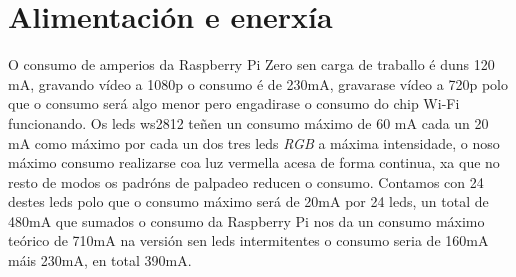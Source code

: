 \section{Alimentación e enerxía}
O consumo de amperios da Raspberry Pi Zero sen carga de traballo é duns 120 mA, gravando vídeo a 1080p o consumo é de 230mA, gravarase vídeo a 720p polo que o consumo será algo menor pero engadirase o consumo do chip Wi-Fi funcionando. Os leds ws2812 teñen un consumo máximo de 60 mA cada un 20 mA como máximo por cada un dos tres leds \emph{RGB} a máxima intensidade, o noso máximo consumo realizarse coa luz vermella acesa de forma continua, xa que no resto de modos os padróns de palpadeo reducen o consumo. Contamos con 24 destes leds polo que o consumo máximo será de 20mA por 24 leds, un total de 480mA que sumados o consumo da Raspberry Pi nos da un consumo máximo teórico de 710mA na versión sen leds intermitentes o consumo seria de 160mA máis 230mA, en total 390mA.

